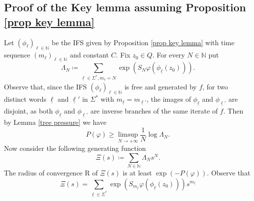 \documentclass[10pt,a4paper]{amsart}
\numberwithin{equation}{section} %
\numberwithin{figure}{section} %
\newcommand{\N}{\mathbb{N}}
\renewcommand{\=}{\coloneqq}
\begin{document}
\subsection{Proof of the Key lemma assuming Proposition \ref{prop key lemma}}
 Let $(\phi_{\ell})_{\ell\in \N}$ be the IFS given by Proposition \ref{prop key lemma} with time sequence $(m_\ell)_{\ell\in \N}$ and constant $C$. Fix $z_0 \in Q$. For every $N\in \N$ put
    \begin{equation}
      \Lambda_N\=\sum_{\underline{\ell}\in \Sigma^*, m_{\underline{\ell}}=N} \exp(S_N\varphi (\phi_{\underline{\ell}}(z_0))).
    \end{equation}
   Observe that, since the IFS $(\phi_{\ell})_{\ell\in \N}$ is free and generated by $f$, for two distinct words $\underline{\ell}$ and $\underline{\ell}'$ in $\Sigma^*$ with $m_{\underline{\ell}}=m_{\underline{\ell}'}$, the images of $\phi_{\underline{\ell}}$ and $\phi_{\underline{\ell}'}$ are disjoint, as both $\phi_{\underline{\ell}}$ and $\phi_{\underline{\ell}'}$ are inverse branches of the same iterate of $f$. Then by Lemma \ref{tree pressure} we have
    \begin{equation}
        P(\varphi) \geq \limsup_{N\to+\infty}\frac{1}{N}\log \Lambda_N.    
    \end{equation}
    Now consider the following generating function
    \begin{equation}
        \Xi(s) \= \sum_{N\in\N} \Lambda_N s^N.
    \end{equation}
    The radius of convergence R of $\Xi(s)$ is at least $\exp(-P(\varphi))$. Observe that
    \begin{equation}
        \Xi(s)= \sum_{\underline{\ell}\in \Sigma^*}\exp( S_{m_{\underline{\ell}}} \varphi (\phi_{\underline{\ell}}(z_0)))s^{m_{\underline{\ell}}}
    \end{equation}
    
\end{document}
